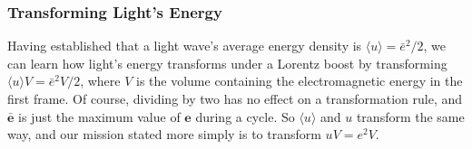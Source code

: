 \documentclass[12pt]{article}
\renewcommand{\vv}[1]{\mathbf{#1}}
\begin{document}
\subsubsection[Transforming Light’s Energy]{Transforming Light's Energy}

Having established that a light wave's average energy density is $\langle u \rangle = \bar{e}^2 / 2$, we can learn how light's energy transforms under a Lorentz boost by transforming $\langle u \rangle V = \bar{e}^2 V / 2$, where $V$ is the volume containing the electromagnetic energy in the first frame. Of course, dividing by two has no effect on a transformation rule, and $\bar{\vv e}$ is just the maximum value of $\vv e$ during a cycle. So $\langle u \rangle$ and $u$ transform the same way, and our mission stated more simply is to transform $uV = e^2 V$.
\end{document}
